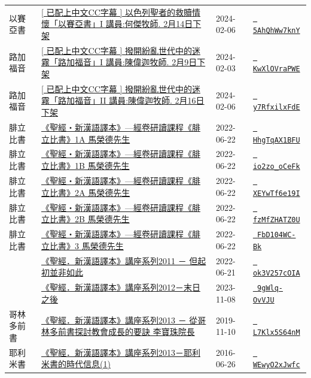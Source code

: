 \documentclass{book}
\begin{document}
{\begin{xltabular}{\textwidth}{|p{0.15\textwidth} p{0.6\textwidth}|p{0.07\textwidth} p{0.1\textwidth}|}
以賽亞書   & \hyperref[sec:5AhQhWw7knY]{[ 已配上中文CC字幕 ] 以色列聖者的救贖情懷「以賽亞書」I 講員:何傑牧師. 2月14日下架} & 2024-02-06 & \href{https://youtube.com/watch?v=5AhQhWw7knY}{\texttt{ 5AhQhWw7knY}} \\
路加福音   & \hyperref[sec:KwXlOVraPWE]{[ 已配上中文CC字幕 ] 撥開紛亂世代中的迷霧「路加福音」I  講員:陳偉迦牧師. 2月9日下架} & 2024-02-03 & \href{https://youtube.com/watch?v=KwXlOVraPWE}{\texttt{ KwXlOVraPWE}} \\
路加福音   & \hyperref[sec:y7RfxilxFdE]{[ 已配上中文CC字幕 ] 撥開紛亂世代中的迷霧「路加福音」II  講員:陳偉迦牧師. 2月16日下架} & 2024-02-06 & \href{https://youtube.com/watch?v=y7RfxilxFdE}{\texttt{ y7RfxilxFdE}} \\
腓立比書   & \hyperref[sec:HhgTqAX1BFU]{《聖經‧新漢語譯本》—經卷研讀課程《腓立比書》1A 馬榮德先生} & 2022-06-22 & \href{https://youtube.com/watch?v=HhgTqAX1BFU}{\texttt{ HhgTqAX1BFU}} \\
腓立比書   & \hyperref[sec:io2zo_oCeFk]{《聖經‧新漢語譯本》—經卷研讀課程《腓立比書》1B 馬榮德先生} & 2022-06-22 & \href{https://youtube.com/watch?v=io2zo_oCeFk}{\texttt{ io2zo\_oCeFk}} \\
腓立比書   & \hyperref[sec:XEYwTf6e19I]{《聖經‧新漢語譯本》—經卷研讀課程《腓立比書》2A 馬榮德先生} & 2022-06-22 & \href{https://youtube.com/watch?v=XEYwTf6e19I}{\texttt{ XEYwTf6e19I}} \\
腓立比書   & \hyperref[sec:fzMfZHATZ0U]{《聖經‧新漢語譯本》—經卷研讀課程《腓立比書》2B 馬榮德先生} & 2022-06-22 & \href{https://youtube.com/watch?v=fzMfZHATZ0U}{\texttt{ fzMfZHATZ0U}} \\
腓立比書   & \hyperref[sec:FbD104WC_Bk]{《聖經‧新漢語譯本》—經卷研讀課程《腓立比書》3 馬榮德先生} & 2022-06-22 & \href{https://youtube.com/watch?v=FbD104WC-Bk}{\texttt{ FbD104WC-Bk}} \\
    & \hyperref[sec:ok3V257cOIA]{《聖經．新漢語譯本》講座系列2011 － 但起初並非如此} & 2022-06-21 & \href{https://youtube.com/watch?v=ok3V257cOIA}{\texttt{ ok3V257cOIA}} \\
    & \hyperref[sec:9gWlq_OvVJU]{《聖經．新漢語譯本》講座系列2012－末日之後} & 2023-11-08 & \href{https://youtube.com/watch?v=9gWlq-OvVJU}{\texttt{ 9gWlq-OvVJU}} \\
哥林多前書   & \hyperref[sec:L7Klx5S64nM]{《聖經．新漢語譯本》講座系列2013 － 從哥林多前書探討教會成長的要訣 李寶珠院長} & 2019-11-10 & \href{https://youtube.com/watch?v=L7Klx5S64nM}{\texttt{ L7Klx5S64nM}} \\
耶利米書   & \hyperref[sec:WEwyO2xJwfc]{《聖經．新漢語譯本》講座系列2013－耶利米書的時代信息(1)} & 2016-06-26 & \href{https://youtube.com/watch?v=WEwyO2xJwfc}{\texttt{ WEwyO2xJwfc}} \\

\end{xltabular}}
\end{document}
